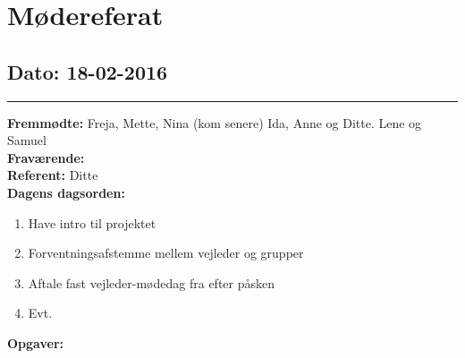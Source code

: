 \chapter{Mødereferat}

\section{Dato: 18-02-2016}
\hrule
\textbf{Fremmødte: } Freja, Mette, Nina (kom senere) Ida, Anne og Ditte. Lene og Samuel \\
\textbf{Fraværende: } \\
\textbf{Referent: } Ditte \\
\textbf{Dagens dagsorden: }
\begin{enumerate}
	\item Have intro til projektet
	\item Forventningsafstemme mellem vejleder og grupper
	\item Aftale fast vejleder-mødedag fra efter påsken
	\item Evt. 
\end{enumerate}

\textbf{Opgaver:} \newline

